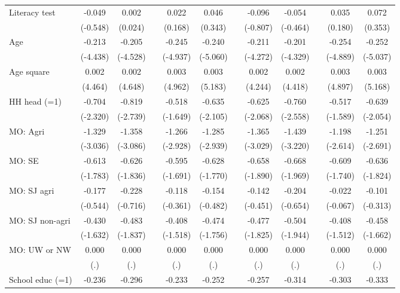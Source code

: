 {\begin{longtable}{@{\extracolsep{\fill}}lccccccccccc}
    Literacy test & -0.049 & 0.002 &   & 0.022 & 0.046 &   & -0.096 & -0.054 &   & 0.035 & 0.072 \\
      & (-0.548) & (0.024) &   & (0.168) & (0.343) &   & (-0.807) & (-0.464) &   & (0.180) & (0.353) \\
    Age & -0.213 & -0.205 &   & -0.245 & -0.240 &   & -0.211 & -0.201 &   & -0.254 & -0.252 \\
      & (-4.438) & (-4.528) &   & (-4.937) & (-5.060) &   & (-4.272) & (-4.329) &   & (-4.889) & (-5.037) \\
    Age square & 0.002 & 0.002 &   & 0.003 & 0.003 &   & 0.002 & 0.002 &   & 0.003 & 0.003 \\
      & (4.464) & (4.648) &   & (4.962) & (5.183) &   & (4.244) & (4.418) &   & (4.897) & (5.168) \\
    HH head (=1) & -0.704 & -0.819 &   & -0.518 & -0.635 &   & -0.625 & -0.760 &   & -0.517 & -0.639 \\
      & (-2.320) & (-2.739) &   & (-1.649) & (-2.105) &   & (-2.068) & (-2.558) &   & (-1.589) & (-2.054) \\
    MO: Agri & -1.329 & -1.358 &   & -1.266 & -1.285 &   & -1.365 & -1.439 &   & -1.198 & -1.251 \\
      & (-3.036) & (-3.086) &   & (-2.928) & (-2.939) &   & (-3.029) & (-3.220) &   & (-2.614) & (-2.691) \\
    MO: SE & -0.613 & -0.626 &   & -0.595 & -0.628 &   & -0.658 & -0.668 &   & -0.609 & -0.636 \\
      & (-1.783) & (-1.836) &   & (-1.691) & (-1.770) &   & (-1.890) & (-1.969) &   & (-1.740) & (-1.824) \\
    MO: SJ agri & -0.177 & -0.228 &   & -0.118 & -0.154 &   & -0.142 & -0.204 &   & -0.022 & -0.101 \\
      & (-0.544) & (-0.716) &   & (-0.361) & (-0.482) &   & (-0.451) & (-0.654) &   & (-0.067) & (-0.313) \\
    MO: SJ non-agri & -0.430 & -0.483 &   & -0.408 & -0.474 &   & -0.477 & -0.504 &   & -0.408 & -0.458 \\
      & (-1.632) & (-1.837) &   & (-1.518) & (-1.756) &   & (-1.825) & (-1.944) &   & (-1.512) & (-1.662) \\
    MO: UW or NW & 0.000 & 0.000 &   & 0.000 & 0.000 &   & 0.000 & 0.000 &   & 0.000 & 0.000 \\
      & (.) & (.) &   & (.) & (.) &   & (.) & (.) &   & (.) & (.) \\
    School educ (=1) & -0.236 & -0.296 &   & -0.233 & -0.252 &   & -0.257 & -0.314 &   & -0.303 & -0.333 \\

\end{longtable}}
